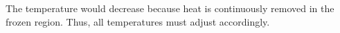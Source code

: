 The temperature would decrease because heat is continuously removed in the frozen region. Thus, all temperatures must adjust accordingly.